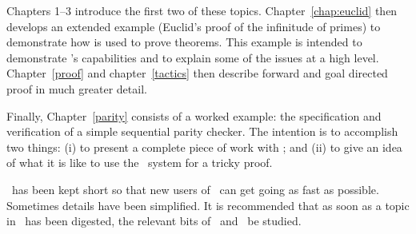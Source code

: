 Chapters 1--3 introduce the first two of these topics.
Chapter~\ref{chap:euclid} then develops an extended example (Euclid's
proof of the infinitude of primes) to demonstrate how \HOL{} is used
to prove theorems.  This example is intended to demonstrate \HOL{}'s
capabilities and to explain some of the issues at a high level.
Chapter~\ref{proof} and chapter~\ref{tactics} then describe forward
and goal directed proof in much greater detail.

Finally, Chapter~\ref{parity} consists of a worked example: the
specification and verification of a simple sequential parity checker.
The intention is to accomplish two things: (i) to present a complete
piece of work with \HOL; and (ii) to give an idea of what it is like
to use the \HOL\ system for a tricky proof.




\noindent
\TUTORIAL\ has been kept short so that new users of \HOL\ can get
going as fast as possible. Sometimes details have been simplified. It
is recommended that as soon as a topic in \TUTORIAL\ has been
digested, the relevant bits of \DESCRIPTION\ and \REFERENCE\ be
studied.


